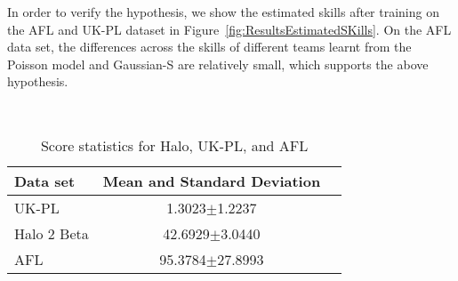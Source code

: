 In order to verify the hypothesis, we show the estimated skills after
training on the AFL and UK-PL dataset in
Figure~\ref{fig:ResultsEstimatedSKills}. On the AFL data set, the
differences across the skills of different teams learnt from the
Poisson model and Gaussian-S are relatively small, which supports the
above hypothesis.

\begin{figure*}[t!]
 \centering
 \vspace{-3cm}
 \\
 \vspace{-1.5cm}
\caption{Estimated skill levels of teams on the AFL (left) and UK-PL
  data (right) sets. Error bar indicates standard deviation.}
\label{fig:ResultsEstimatedSKills}
\end{figure*}

\ENDCOMMENT


\COMMENT
\begin{table}
\caption{Score statistics for Halo, UK-PL, and AFL}
\begin{center}
\small
\begin{tabular}{|l|c|c|}
  \hline
  Data set          & Mean and Standard Deviation\\
  \hline
  UK-PL             &  1.3023$\pm$1.2237 \\
  Halo 2 Beta     & 42.6929$\pm$3.0440 \\
  AFL                 &95.3784$\pm$27.8993 \\
  \hline
\end{tabular}
\label{table:datasetStatistics}
\end{center}
\end{table}
\ENDCOMMENT

